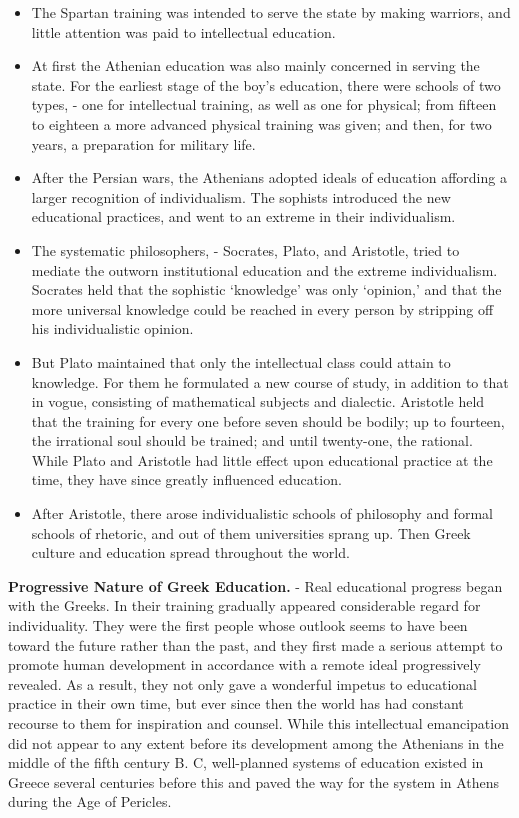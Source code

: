 \documentclass[
]{book}
\providecommand{\tightlist}{%
  \setlength{\itemsep}{0pt}\setlength{\parskip}{0pt}}
\begin{document}
\begin{itemize}
\tightlist
\item
  The Spartan training was intended to serve the state by making warriors, and little attention was paid to intellectual education.
\item
  At first the Athenian education was also mainly concerned in serving the state. For the earliest stage of the boy's education, there were schools of two types, - one for intellectual training, as well as one for physical; from fifteen to eighteen a more advanced physical training was given; and then, for two years, a preparation for military life.
\item
  After the Persian wars, the Athenians adopted ideals of education affording a larger recognition of individualism. The sophists introduced the new educational practices, and went to an extreme in their individualism.
\item
  The systematic philosophers, - Socrates, Plato, and Aristotle, tried to mediate the outworn institutional education and the extreme individualism. Socrates held that the sophistic `knowledge' was only `opinion,' and that the more universal knowledge could be reached in every person by stripping off his individualistic opinion.
\item
  But Plato maintained that only the intellectual class could attain to knowledge. For them he formulated a new course of study, in addition to that in vogue, consisting of mathematical subjects and dialectic. Aristotle held that the training for every one before seven should be bodily; up to fourteen, the irrational soul should be trained; and until twenty-one, the rational. While Plato and Aristotle had little effect upon educational practice at the time, they have since greatly influenced education.
\item
  After Aristotle, there arose individualistic schools of philosophy and formal schools of rhetoric, and out of them universities sprang up. Then Greek culture and education spread throughout the world.
\end{itemize}

\textbf{Progressive Nature of Greek Education.} - Real educational progress began with the Greeks. In their training gradually appeared considerable regard for individuality. They were the first people whose outlook seems to have been toward the future rather than the past, and they first made a serious attempt to promote human development in accordance with a remote ideal progressively revealed. As a result, they not only gave a wonderful impetus to educational practice in their own time, but ever since then the world has had constant recourse to them for inspiration and counsel. While this intellectual emancipation did not appear to any extent before its development among the Athenians in the middle of the fifth century B. C, well-planned systems of education existed in Greece several centuries before this and paved the way for the system in Athens during the Age of Pericles.
\end{document}
